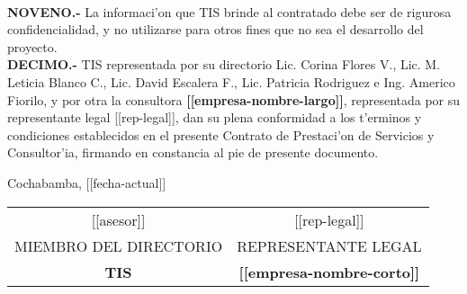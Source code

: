 \documentclass{article}
\newcommand{\fecha}[0]{[[fecha-actual]]}
\newcommand{\empresa}[0]{\textbf{[[empresa-nombre-largo]]}}
\newcommand{\empresaL}[0]{\textbf{[[empresa-nombre-corto]]}}
\newcommand{\representante}[0]{[[rep-legal]]}
\newcommand{\asesor}[0]{[[asesor]]}
\begin{document}
\\
{\bf{NOVENO.-}}  La informaci'on que TIS brinde al contratado debe ser de rigurosa confidencialidad, y no utilizarse para otros fines que no sea el desarrollo del proyecto.
\\
{\bf{DECIMO.-}} TIS representada por su directorio Lic. Corina Flores V., Lic. M. Leticia Blanco C., Lic. David Escalera F., Lic. Patricia Rodriguez e Ing. Americo Fiorilo, y por otra la consultora \empresa,  representada por su representante legal \representante, dan su plena conformidad a los t'erminos y condiciones establecidos en el presente Contrato de Prestaci'on de Servicios y Consultor'ia, firmando en constancia al pie de presente documento.
\\
\begin{center}{Cochabamba, \fecha}
\vspace{20mm}

\begin{tabular}{ c c }
\asesor & \representante \\
MIEMBRO DEL DIRECTORIO & REPRESENTANTE LEGAL \\
\textbf{TIS} & \empresaL
\end{tabular}
\end{center}
\end{document}
